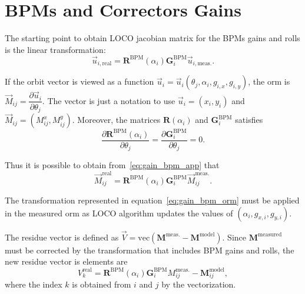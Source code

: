 \chapter{BPMs and Correctors Gains}\label{appendix:gains}

The starting point to obtain LOCO jacobian matrix for the BPMs gains and rolls is the linear transformation:
\begin{equation}
    \vec{u}_{i, \mathrm{real}} = \mathbf{R}^{\mathrm{BPM}}\left(\alpha_i\right) \mathbf{G}_{i}^{\mathrm{BPM}} \vec{u}_{i, \mathrm{meas.}}.
    \label{eq:gain_bpm_app}
\end{equation}

If the orbit vector is viewed as a function $\vec{u}_i = \vec{u}_i\left(\theta_j, \alpha_i, g_{i, x}, g_{i, y}\right)$, the \gls{orm} is $\vec{M}_{ij} = \dfrac{\partial \vec{u}_i}{\partial \theta_j}$. The vector is just a notation to use $\vec{u}_i = (x_i, y_i)$ and $\vec{M}_{ij} = \left(M_{ij}^x, M_{ij}^y\right)$. Moreover, the matrices $\mathbf{R}\left(\alpha_i\right)$ and $\mathbf{G}_{i}^{\mathrm{BPM}}$ satisfies
\begin{equation*}
\dfrac{\partial \mathbf{R}^\mathrm{BPM}\left(\alpha_i\right)}{ \partial  \theta_j} = \dfrac{\partial \mathbf{G}_{i}^{\mathrm{BPM}}}{ \partial \theta_j} = 0.
\end{equation*}

Thus it is possible to obtain from~\eqref{eq:gain_bpm_app} that
\begin{equation}
    \vec{M}_{ij}^{\mathrm{real}} = \mathbf{R}^\mathrm{BPM}\left(\alpha_i\right) \mathbf{G}_{i}^{\mathrm{BPM}} \vec{M}_{ij}^{\mathrm{meas.}}.
    \label{eq:gain_bpm_orm}
\end{equation}

The transformation represented in equation~\eqref{eq:gain_bpm_orm} must be applied in the measured \gls{orm} as LOCO algorithm updates the values of $\left(\alpha_i, g_{x, i}, g_{y, i}\right)$. 

The residue vector is defined as $\vec{V} = \mathrm{vec}\left(\mathbf{M}^{\mathrm{meas.}} - \mathbf{M}^{\mathrm{model}}\right)$. Since $\mathbf{M}^{\mathrm{measured}}$ must be corrected by the transformation that includes BPM gains and rolls, the new residue vector is elements are 
\begin{equation}
    {V}_k^{\mathrm{real}} = \mathbf{R}^\mathrm{BPM}\left(\alpha_i\right) \mathbf{G}_{i}^{\mathrm{BPM}} {M}^{\mathrm{meas.}}_{ij} - \mathbf{M}^{\mathrm{model}}_{ij},
\end{equation}
where the index $k$ is obtained from $i$ and $j$ by the vectorization. 


